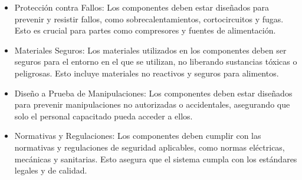 \begin{itemize}
	
	\begin{itemize}
		\item {Protección contra Fallos:} Los componentes deben estar diseñados para prevenir y resistir fallos, como sobrecalentamientos, cortocircuitos y fugas. Esto es crucial para partes como compresores y fuentes de alimentación.
		\item {Materiales Seguros:} Los materiales utilizados en los componentes deben ser seguros para el entorno en el que se utilizan, no liberando sustancias tóxicas o peligrosas. Esto incluye materiales no reactivos y seguros para alimentos.
		\item {Diseño a Prueba de Manipulaciones:} Los componentes deben estar diseñados para prevenir manipulaciones no autorizadas o accidentales, asegurando que solo el personal capacitado pueda acceder a ellos.
		\item  {Normativas y Regulaciones:} Los componentes deben cumplir con las normativas y regulaciones de seguridad aplicables, como normas eléctricas, mecánicas y sanitarias. Esto asegura que el sistema cumpla con los estándares legales y de calidad.
	\end{itemize}
	
	
\end{itemize}

